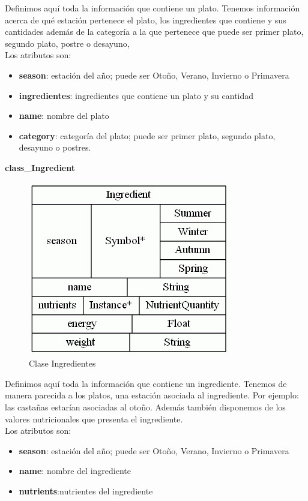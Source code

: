 \documentclass[12]{article}
\begin{document}
Definimos aquí toda la información que contiene un plato. Tenemos información acerca de qué estación pertenece el plato, los ingredientes que contiene y sus cantidades además de la categoría a la que pertenece que puede ser primer plato, segundo plato, postre o desayuno, 
\\

Los atributos son:
\begin{itemize}
\item \textbf{season}: estación del año; puede ser Otoño, Verano, Invierno o Primavera
\item \textbf{ingredientes}: ingredientes que contiene un plato y su cantidad
\item \textbf{name}: nombre del plato
\item \textbf{category}: categoría del plato; puede ser primer plato, segundo plato, desayuno o postres. 
\end{itemize}


\vspace{0.5cm}

\textbf{class\_Ingredient}
\begin{figure}[H]
\centering
\includegraphics[scale=0.5]{images/classIngredient.png}
\caption{Clase Ingredientes}
\label{ingredientes}
\end{figure}

Definimos aquí toda la información que contiene un ingrediente. Tenemos de manera parecida a los platos, una estación asociada al ingrediente. Por ejemplo: las castañas estarían asociadas al otoño. Además también disponemos de los valores nutricionales que presenta el ingrediente.
\\

Los atributos son: 

\begin{itemize}
\item \textbf{season}: estación del año; puede ser Otoño, Verano, Invierno o Primavera
\item \textbf{name}: nombre del ingrediente
\item \textbf{nutrients}:nutrientes del ingrediente
\end{itemize}
\end{document}
